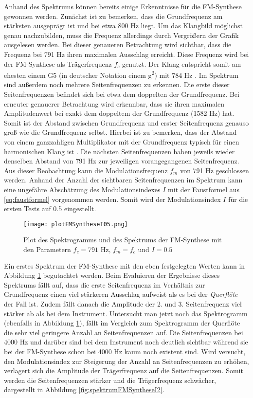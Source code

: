 Anhand des Spektrums können bereits einige Erkenntnisse für die FM-Synthese gewonnen werden. Zunächst ist zu bemerken, dass die Grundfrequenz am stärksten ausgeprägt ist und bei etwa 800 Hz liegt. Um das Klangbild möglichst genau nachzubilden, muss die Frequenz allerdings durch Vergrößern der Grafik ausgelesen werden. Bei dieser genaueren Betrachtung wird sichtbar, dass die Frequenz bei 791 Hz ihren maximalen Ausschlag erreicht. Diese Frequenz wird bei der FM-Synthese als Trägerfrequenz $f_c$ genutzt. Der Klang entspricht somit am ehesten einem G5 (in deutscher Notation einem g\textsuperscript{2}) mit 784 Hz \cite[S. 181]{borucki}. Im Spektrum sind außerdem noch mehrere Seitenfrequenzen zu erkennen. Die erste dieser Seitenfrequenzen befindet sich bei etwa dem doppelten der Grundfrequenz. Bei erneuter genauerer Betrachtung wird erkennbar, dass sie ihren maximalen Amplitudenwert bei exakt dem doppeltem der Grundfrequenz (1582 Hz) hat. Somit ist der Abstand zwischen Grundfrequenz und erster Seitenfrequenz genauso groß wie die Grundfrequenz selbst. Hierbei ist zu bemerken, dass der Abstand von einem ganzzahligen Multiplikator mit der Grundfrequenz typisch für einen harmonischen Klang ist \cite[S. 528]{chowningPaper}. Die nächsten Seitenfrequenzen haben jeweils wieder denselben Abstand von 791 Hz zur jeweiligen vorangegangenen Seitenfrequenz. Aus dieser Beobachtung kann die Modulationsfrequenz $f_m$ von 791 Hz geschlossen werden. Anhand der Anzahl der sichtbaren Seitenfrequenzen im Spektrum kann eine ungefähre Abschätzung des Modulationsindexes $I$ mit der Faustformel aus \ref{eq:faustformel} vorgenommen werden. Somit wird der Modulationsindex $I$ für die ersten Tests auf 0.5 eingestellt. 

\begin{figure} [ht]
\centering
  \texttt{[image: plotFMSyntheseI05.png]}
\caption{Plot des Spektrogramms und des Spektrums der FM-Synthese mit den Parametern $f_c = 791$ Hz, $f_m = f_c$ und $I = 0.5$ }
\label{fig:plotFMSyntheseI05}
\end{figure}

Ein erstes Spektrum der FM-Synthese mit den eben festgelegten Werten kann in Abbildung \ref{fig:plotFMSyntheseI05} begutachtet werden. Beim Evaluieren der Ergebnisse dieses Spektrums fällt auf, dass die erste Seitenfrequenz im Verhältnis zur Grundfrequenz einen viel stärkeren Ausschlag aufweist als es bei der \textit{Querflöte} der Fall ist. Zudem fällt danach die Amplitude der 2. und 3. Seitenfrequenz viel stärker ab als bei dem Instrument. Untersucht man jetzt noch das Spektrogramm (ebenfalls in Abbildung \ref{fig:plotFMSyntheseI05}), fällt im Vergleich zum Spektrogramm der Querflöte die sehr viel geringere Anzahl an Seitenfrequenzen auf. Die Seitenfrequenzen bei 4000 Hz und darüber sind bei dem Instrument noch deutlich sichtbar während sie bei der FM-Synthese schon bei 4000 Hz kaum noch existent sind. Wird versucht, den Modulationsindex zur Steigerung der Anzahl an Seitenfrequenzen zu erhöhen, verlagert sich die Amplitude der Trägerfrequenz auf die Seitenfrequenzen. Somit werden die Seitenfrequenzen stärker und die Trägerfrequenz schwächer, dargestellt in Abbildung \ref{fig:spektrumFMSyntheseI2}. 


